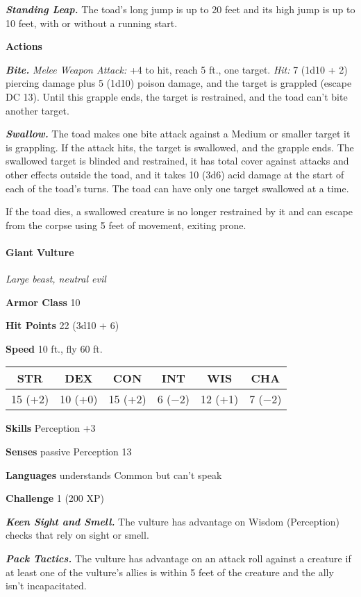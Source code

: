 \documentclass[
]{article}
\begin{document}
\emph{\textbf{Standing Leap.}} The toad's long jump is up to 20 feet and
its high jump is up to 10 feet, with or without a running start.

\textbf{Actions}

\emph{\textbf{Bite.}} \emph{Melee Weapon Attack:} +4 to hit, reach 5
ft., one target. \emph{Hit:} 7 (1d10 + 2) piercing damage plus 5 (1d10)
poison damage, and the target is grappled (escape DC 13). Until this
grapple ends, the target is restrained, and the toad can't bite another
target.

\emph{\textbf{Swallow.}} The toad makes one bite attack against a Medium
or smaller target it is grappling. If the attack hits, the target is
swallowed, and the grapple ends. The swallowed target is blinded and
restrained, it has total cover against attacks and other effects outside
the toad, and it takes 10 (3d6) acid damage at the start of each of the
toad's turns. The toad can have only one target swallowed at a time.

If the toad dies, a swallowed creature is no longer restrained by it and
can escape from the corpse using 5 feet of movement, exiting prone.

\hypertarget{giant-vulture}{%
\paragraph{Giant Vulture}\label{giant-vulture}}

\emph{Large beast, neutral evil}

\textbf{Armor Class} 10

\textbf{Hit Points} 22 (3d10 + 6)

\textbf{Speed} 10 ft., fly 60 ft.

\begin{longtable}[]{@{}cccccc@{}}
\toprule
STR & DEX & CON & INT & WIS & CHA\tabularnewline
\midrule
\endhead
15 (+2) & 10 (+0) & 15 (+2) & 6 (−2) & 12 (+1) & 7 (−2)\tabularnewline
\bottomrule
\end{longtable}

\textbf{Skills} Perception +3

\textbf{Senses} passive Perception 13

\textbf{Languages} understands Common but can't speak

\textbf{Challenge} 1 (200 XP)

\emph{\textbf{Keen Sight and Smell.}} The vulture has advantage on
Wisdom (Perception) checks that rely on sight or smell.

\emph{\textbf{Pack Tactics.}} The vulture has advantage on an attack
roll against a creature if at least one of the vulture's allies is
within 5 feet of the creature and the ally isn't incapacitated.
\end{document}
